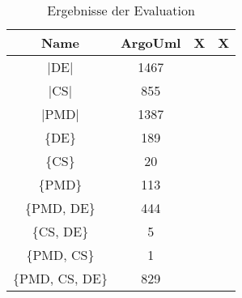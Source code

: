\begin{table}[]
    \centering
    \begin{tabular}{c|c|c|c}
    Name & ArgoUml & X & X\\\hline
    |DE| &1467 & &\\\hline
    |CS| &855 & &\\\hline
    |PMD|&1387 & &\\\hline
    
    \{DE\} &189 & &\\\hline
    \{CS\} &20 & &\\\hline
    \{PMD\} &113 & &\\\hline
    \{PMD, DE\} &444 & &\\\hline
    \{CS, DE\} &5 & &\\\hline
    \{PMD, CS\} & 1& &\\\hline
    \{PMD, CS, DE\} &829 & &\\\hline
    \end{tabular}
    \caption{Ergebnisse der Evaluation}
    \label{tab:eval_results}
\end{table}
\begin{comment}
\section{Unit-Test}
Dir grundlegende Vorgehensweise zur Prüfung, ob ein Programm seinen Anforderung genügt, sind Unit-Tests. Bei Unit-Tests oder auch Modul- oder Komponententests wird eine genau abgegrenzte Komponente des Programms getestet. Dabei werden die Komponente zunächst in einem bestimmten Zustand gebracht, indem beispielsweise bestimmte Eingabeparameter vorgegeben werden. Anschließend werden bestimmte Operationen auf der Komponente angewendet. Am Schluss wird der Zustand der Komponente angefragt und geprüft, ob der Zustand der Komponente nach allen Operationen so ist, wie es gemäß den Anforderungen zu erwarten ist. Gibt es Abweichung beim Zustand, so wird der Entwickler sofort informiert. 

Im Kontext des Programmms wurden die drei Arbeitspakete Traversierung, Parsing und Bewertung durch Metriken getestet.
\end{comment}
